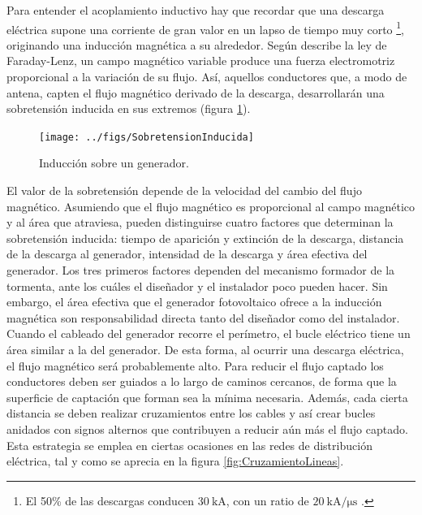 Para entender el acoplamiento inductivo hay que recordar que una descarga
eléctrica supone una corriente de gran valor en un lapso de tiempo
muy corto%
\footnote{El 50\% de las descargas conducen $\SI{30}{\kilo\ampere}$, con un
ratio de $\SI{20}{\kilo\ampere\per\micro\second}$ \cite{Becker.Vaaben.ea2000}.%
}, originando una inducción magnética a su alrededor. Según describe
la ley de Faraday-Lenz, un campo magnético variable produce una fuerza
electromotriz proporcional a la variación de su flujo. Así, aquellos
conductores que, a modo de antena, capten el flujo magnético derivado
de la descarga, desarrollarán una sobretensión inducida en sus extremos
(figura \ref{fig:InduccionGenerador}).

%
\begin{figure}
\begin{centering}
\texttt{[image: ../figs/SobretensionInducida]}
\end{centering}

\caption{\label{fig:InduccionGenerador}Inducción sobre un generador.}

\end{figure}


El valor de la sobretensión depende de la velocidad del cambio del
flujo magnético. Asumiendo que el flujo magnético es proporcional
al campo magnético y al área que atraviesa, pueden distinguirse cuatro
factores que determinan la sobretensión inducida: tiempo de aparición
y extinción de la descarga, distancia de la descarga al generador,
intensidad de la descarga y área efectiva del generador. Los tres
primeros factores dependen del mecanismo formador de la tormenta,
ante los cuáles el diseñador y el instalador poco pueden hacer. Sin
embargo, el área efectiva que el generador fotovoltaico ofrece a la
inducción magnética son responsabilidad directa tanto del diseñador
como del instalador. Cuando el cableado del generador recorre el perímetro,
el bucle eléctrico tiene un área similar a la del generador. De esta
forma, al ocurrir una descarga eléctrica, el flujo magnético será
probablemente alto. Para reducir el flujo captado los conductores
deben ser guiados a lo largo de caminos cercanos, de forma que la
superficie de captación que forman sea la mínima necesaria. Además,
cada cierta distancia se deben realizar cruzamientos entre los cables
y así crear bucles anidados con signos alternos que contribuyen a
reducir aún más el flujo captado. Esta estrategia se emplea en ciertas
ocasiones en las redes de distribución eléctrica, tal y como se aprecia
en la figura \ref{fig:CruzamientoLineas}.

